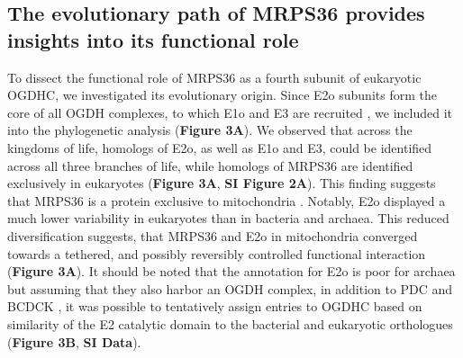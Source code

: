\documentclass[times, twoside]{zHenriquesLab-StyleBioRxiv}
\begin{document}
\subsection*{The evolutionary path of MRPS36 provides insights into its functional role}
To dissect the functional role of MRPS36 as a fourth subunit of eukaryotic OGDHC, we investigated its evolutionary origin. Since E2o subunits form the core of all OGDH complexes, to which E1o and E3 are recruited \cite{Nemeria_2021}, we included it into the phylogenetic analysis (\textbf{Figure 3A}). We observed that across the kingdoms of life, homologs of E2o, as well as E1o and E3, could be identified across all three branches of life, while homologs of MRPS36 are identified exclusively in eukaryotes (\textbf{Figure 3A}, \textbf{SI Figure 2A}). This finding suggests that MRPS36 is a protein exclusive to mitochondria \cite{Gray_2015}. Notably, E2o displayed a much lower variability in eukaryotes than in bacteria and archaea. This reduced diversification suggests, that MRPS36 and E2o in mitochondria converged towards a tethered, and possibly reversibly controlled functional interaction (\textbf{Figure 3A}). It should be noted that the annotation for E2o is poor for archaea but assuming that they also harbor an OGDH complex, in addition to PDC and BCDCK \cite{Heath_2007}, it was possible to tentatively assign entries to OGDHC based on similarity of the E2 catalytic domain to the bacterial and eukaryotic orthologues (\textbf{Figure 3B}, \textbf{SI Data}).
\end{document}
